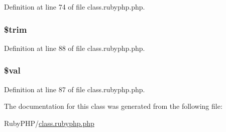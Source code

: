 Definition at line 74 of file class.\-rubyphp.\-php.

\hypertarget{class_pierce_moore_1_1_ruby_p_h_p_1_1r_a0ca8b395aaa07c4aac3bdb1f9964d4f5}{
\subsubsection[{\$trim}]{\setlength{\rightskip}{0pt plus 5cm}\$trim}}\label{class_pierce_moore_1_1_ruby_p_h_p_1_1r_a0ca8b395aaa07c4aac3bdb1f9964d4f5}


Definition at line 88 of file class.\-rubyphp.\-php.

\hypertarget{class_pierce_moore_1_1_ruby_p_h_p_1_1r_aac81a74a7b30767af29bfd9a695636df}{
\subsubsection[{\$val}]{\setlength{\rightskip}{0pt plus 5cm}\${\bf val}}}\label{class_pierce_moore_1_1_ruby_p_h_p_1_1r_aac81a74a7b30767af29bfd9a695636df}


Definition at line 87 of file class.\-rubyphp.\-php.



The documentation for this class was generated from the following file\-:\begin{DoxyCompactItemize}
\item 
Ruby\-P\-H\-P/\hyperlink{class_8rubyphp_8php}{class.\-rubyphp.\-php}\end{DoxyCompactItemize}
